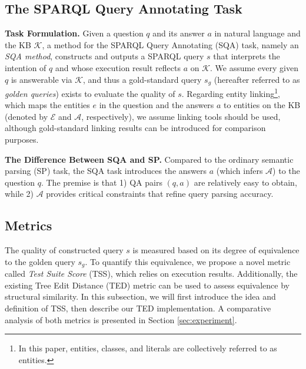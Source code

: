 \documentclass[runningheads]{llncs}
\begin{document}
\subsection{The SPARQL Query Annotating Task}

\noindent\textbf{Task Formulation.}
Given a question $q$ and its answer $a$ in natural language and the KB $\mathcal{K}$, 
a method for the SPARQL Query Annotating (SQA) task, namely an \textit{SQA method}, constructs and outputs a SPARQL query $s$ that interprets the intention of $q$ and whose execution result reflects $a$ on $\mathcal{K}$.
We assume every given $q$ is answerable via $\mathcal{K}$, and thus a gold-standard query $s_g$ (hereafter referred to as \textit{golden queries}) exists to evaluate the quality of $s$.
Regarding entity linking\footnote{In this paper, entities, classes, and literals are collectively referred to as entities.}, which maps the entities $e$ in the question and the answers $a$ to entities on the KB (denoted by $\mathcal{E}$ and $\mathcal{A}$, respectively), we assume linking tools should be used, although gold-standard linking results can be introduced for comparison purposes.

\noindent\textbf{The Difference Between SQA and SP.}
Compared to the ordinary semantic parsing (SP) task, the SQA task introduces the answers $a$ (which infers $\mathcal{A}$) to the question $q$. The premise is that 1) QA pairs $(q, a)$ are relatively easy to obtain, while 2) $\mathcal{A}$ provides critical constraints that refine query parsing accuracy.


\subsection{Metrics}\label{subsec:metrics}

The quality of constructed query $s$ is measured based on its degree of equivalence to the golden query $s_g$.
To quantify this equivalence, we propose a novel metric called \textit{Test Suite Score} (TSS), which relies on execution results.
Additionally, the existing Tree Edit Distance (TED) metric can be used to assess equivalence by structural similarity. 
In this subsection, we will first introduce the idea and definition of TSS, then describe our TED implementation. A comparative analysis of both metrics is presented in Section \ref{sec:experiment}.
\end{document}
